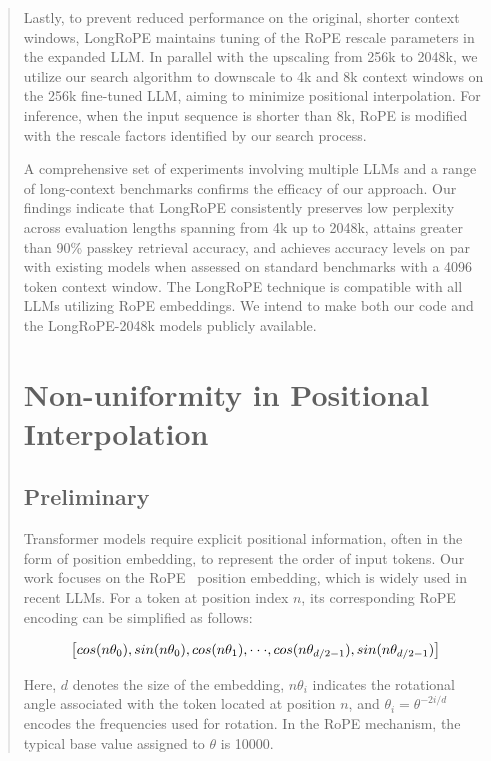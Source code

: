 \begin{abstract}
Lastly, to prevent reduced performance on the original, shorter context windows, {LongRoPE} maintains tuning of the RoPE rescale parameters in the expanded LLM. In parallel with the upscaling from 256k to 2048k, we utilize our search algorithm to downscale to 4k and 8k context windows on the 256k fine-tuned LLM, aiming to minimize positional interpolation. For inference, when the input sequence is shorter than 8k, RoPE is modified with the rescale factors identified by our search process.

A comprehensive set of experiments involving multiple LLMs and a range of long-context benchmarks confirms the efficacy of our approach. Our findings indicate that LongRoPE consistently preserves low perplexity across evaluation lengths spanning from 4k up to 2048k, attains greater than 90\% passkey retrieval accuracy, and achieves accuracy levels on par with existing models when assessed on standard benchmarks with a 4096 token context window. The LongRoPE technique is compatible with all LLMs utilizing RoPE embeddings. We intend to make both our code and the LongRoPE-2048k models publicly available.

\section{Non-uniformity in Positional Interpolation}
\label{sec:analysis}

\subsection{Preliminary}

Transformer models require explicit positional information, often in the form of position embedding, to represent the order of input tokens. Our work focuses on the RoPE~\cite{rope} position embedding, which is widely used in recent  LLMs. For a token at position index $n$, its corresponding RoPE encoding can be simplified as follows:

\begin{equation}
		\fontsize{7.8}{7.8} \selectfont
	\label{eq:rope}
	\left[ cos(n\theta_0), sin(n\theta_0), cos(n\theta_1), \cdot\cdot\cdot, cos(n\theta_{d/2-1}), sin(n\theta_{d/2-1}) \right]   
\end{equation}

Here, $d$ denotes the size of the embedding, $n\theta_i$ indicates the rotational angle associated with the token located at position $n$, and $\theta_i=\theta^{-2i/d}$ encodes the frequencies used for rotation. In the RoPE mechanism, the typical base value assigned to $\theta$ is 10000.


\end{abstract}
